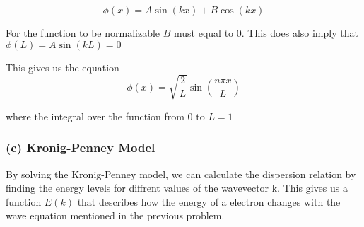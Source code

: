 \begin{equation*}
    \phi(x)=A \sin (kx) + B \cos (kx)
\end{equation*}

For the function to be normalizable $B$ must equal to $0$. This does also imply that $\phi(L)=A \sin (kL)=0$

This gives us the equation
\begin{equation*}
    \phi(x)=\sqrt{\frac{2}{L}} \sin (\frac{n\pi x}{L})
\end{equation*}

where the integral over the function from $0$ to $L = 1$


\subsubsection*{(c) Kronig-Penney Model}

By solving the Kronig-Penney model, we can calculate the dispersion relation by finding the energy levels for diffrent values of the wavevector k. This gives us a function $E(k)$ that describes how the energy of a electron changes with the wave equation mentioned in the previous problem.



